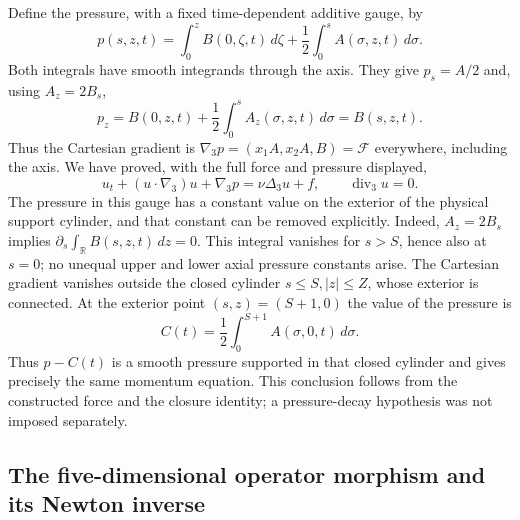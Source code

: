 Define the pressure, with a fixed time-dependent additive gauge, by
\begin{equation}\label{eq:aft-pressure}
 p(s,z,t)=\int_0^z B(0,\zeta,t)\,d\zeta
              +\frac12\int_0^s A(\sigma,z,t)\,d\sigma.
\end{equation}
Both integrals have smooth integrands through the axis.  They give
\(p_s=A/2\) and, using \(A_z=2B_s\),
\[
 p_z=B(0,z,t)+\frac12\int_0^s A_z(\sigma,z,t)\,d\sigma=B(s,z,t).
\]
Thus the Cartesian gradient is \(\nabla_3p=(x_1A,x_2A,B)=\mathcal F\)
everywhere, including the axis.  We have proved, with the full force and
pressure displayed,
\begin{equation}\label{eq:aft-momentum}
 u_t+(u\cdot\nabla_3)u+\nabla_3p=\nu\Delta_3u+f,
 \qquad \operatorname{div}_3u=0.
\end{equation}
The pressure in this gauge has a constant value on the exterior of the
physical support cylinder, and that constant can be removed explicitly.
Indeed, \(A_z=2B_s\) implies
\(\partial_s\int_{\mathbb R}B(s,z,t)\,dz=0\).  This integral vanishes
for \(s>S\), hence also at \(s=0\); no unequal upper and lower axial
pressure constants arise.  The Cartesian gradient vanishes outside the
closed cylinder \(s\leq S, |z|\leq Z\), whose exterior is connected.
At the exterior point \((s,z)=(S+1,0)\) the value of the pressure is
\[
 C(t)=\frac12\int_0^{S+1}A(\sigma,0,t)\,d\sigma.
\]
Thus \(p-C(t)\) is a smooth pressure supported in that closed cylinder
and gives precisely the same momentum equation.  This conclusion follows
from the constructed force and the closure identity; a pressure-decay
hypothesis was not imposed separately.

\subsection{The five-dimensional operator morphism and its Newton inverse}

